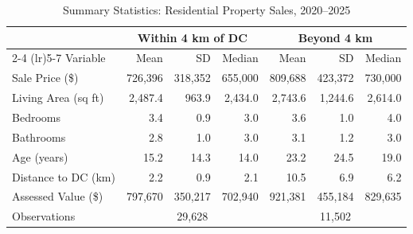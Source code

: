 \begin{table}[H]
\centering
\caption{Summary Statistics: Residential Property Sales, 2020--2025}
\label{tab:descriptive}
\small
\begin{tabular}{lrrrrrr}
\toprule
 & \multicolumn{3}{c}{Within 4 km of DC} & \multicolumn{3}{c}{Beyond 4 km} \\
\cmidrule(lr){2-4} \cmidrule(lr){5-7}
Variable & Mean & SD & Median & Mean & SD & Median \\
\midrule
Sale Price (\$) & 726,396 & 318,352 & 655,000 & 809,688 & 423,372 & 730,000 \\
Living Area (sq ft) & 2,487.4 & 963.9 & 2,434.0 & 2,743.6 & 1,244.6 & 2,614.0 \\
Bedrooms & 3.4 & 0.9 & 3.0 & 3.6 & 1.0 & 4.0 \\
Bathrooms & 2.8 & 1.0 & 3.0 & 3.1 & 1.2 & 3.0 \\
Age (years) & 15.2 & 14.3 & 14.0 & 23.2 & 24.5 & 19.0 \\
Distance to DC (km) & 2.2 & 0.9 & 2.1 & 10.5 & 6.9 & 6.2 \\
Assessed Value (\$) & 797,670 & 350,217 & 702,940 & 921,381 & 455,184 & 829,635 \\
\midrule
Observations & \multicolumn{3}{c}{29,628} & \multicolumn{3}{c}{11,502} \\
\bottomrule
\end{tabular}
\end{table}
